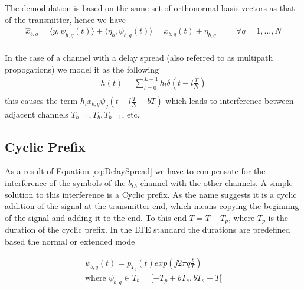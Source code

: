         The demodulation is based on the same set of orthonormal basis vectors as that of the transmitter, hence we have
        \begin{equation}
            \begin{aligned}\label{eq:InnerProductRxIdeal}
                \hat{x}_{b,q} = \langle y,\psi_{b,q}(t)\rangle + \langle\eta_{b},\psi_{b,q}(t)\rangle = x_{b,q}(t) + \eta_{b,q} & & & \forall q = 1,...,N \\
            \end{aligned}
        \end{equation}

        In the case of a channel with a delay spread (also referred to as multipath propogations) we model it as the following
        \begin{equation} \label{eq:DelaySpread}
            \begin{split}
                h(t) = \sum_{l=0}^{L-1}h_l\delta{(t-l\frac{T}{N})} \\ 
            \end{split}
        \end{equation}
        this causes the term $h_lx_{b,q}\psi_q(t-l\frac{T}{N}-bT)$ which leads to interference between adjacent channels $T_{b-1},T_{b},T_{b+1}$, etc.

\subsection{Cyclic Prefix}\label{ssec:CP}

As a result of Equation \ref{eq:DelaySpread} we have to compensate for the interference of the symbols of the $b_{th}$ channel with the other channels. A simple solution to this interference is a Cyclic prefix. As the name suggests it is a cyclic addition of the signal at the transmitter end, which means copying the beginning of the signal and adding it to the end. To this end $T = T + T_p$, where $T_p$ is the duration of the cyclic prefix. In the LTE standard the durations are predefined based the normal or extended mode \cite{3gpp36211}

\begin{equation}
    \begin{split}
        \psi_{b,q}(t) = p_{T_b}(t)exp\left( j2\pi{q}\frac{t}{T} \right) \\
        \text{where} \; \psi_{b,q} \in T_b = [-T_p + bT_s , bT_s + T [
    \end{split}
\end{equation}

